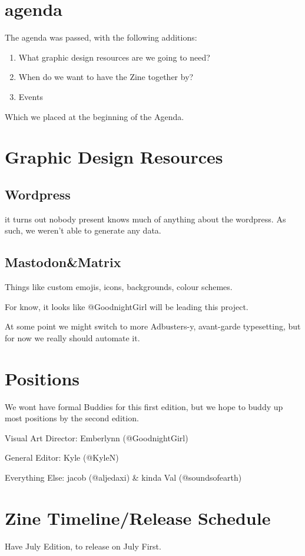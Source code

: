 \section{agenda}
	The agenda was passed, with the following additions:

	\begin{enumerate}
		\item What graphic design resources are we going to need?
		\item When do we want to have the Zine together by?
		\item Events
	\end{enumerate}

	Which we placed at the beginning of the Agenda.
\section{Graphic Design Resources}
	\subsection{Wordpress}
		it turns out nobody present knows much of anything about the wordpress. As such, we weren't able to generate any data.
	\subsection{Mastodon\&Matrix}
	Things like custom emojis, icons, backgrounds, colour schemes.

	For know, it looks like @GoodnightGirl will be leading this project.

	At some point we might switch to more Adbusters-y, avant-garde typesetting, but for now we really should automate it.
\section{Positions}
	We wont have formal Buddies for this first edition, but we hope to buddy up most positions by the second edition.

	Visual Art Director: Emberlynn (@GoodnightGirl)

	General Editor: Kyle (@KyleN)

	Everything Else: jacob (@aljedaxi) \& kinda Val (@soundsofearth)
\section{Zine Timeline/Release Schedule}
	Have July Edition, to release on July First.

